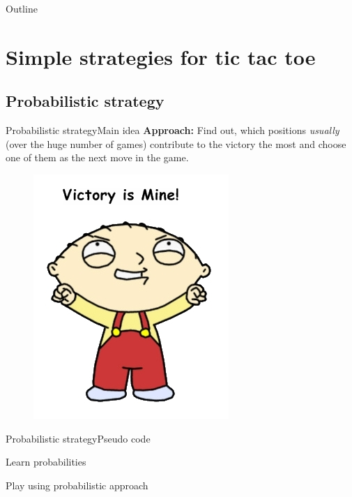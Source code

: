 \documentclass{beamer}
\begin{document}
\begin{frame}
  \titlepage
\end{frame}

\begin{frame}{Outline }
  \tableofcontents
\end{frame}

\section{Simple strategies for tic tac toe}

\subsection{Probabilistic strategy}

\begin{frame}{Probabilistic strategy}{Main idea}
\textbf{Approach:}
Find out, which positions \textit{usually} (over the huge number of games) contribute to the victory the most and choose one of them as the next move in the game.
\begin{figure}
	\includegraphics[scale = 0.5]{victory.jpg}	
\end{figure}
\end{frame}

\begin{frame}{Probabilistic strategy}{Pseudo code}
\begin{block}{Learn probabilities}
\Probabilistic

\end{block}
\begin{block}{Play using probabilistic approach}
\ProbabilisticPlay
\end{block}
\end{frame}
\end{document}
